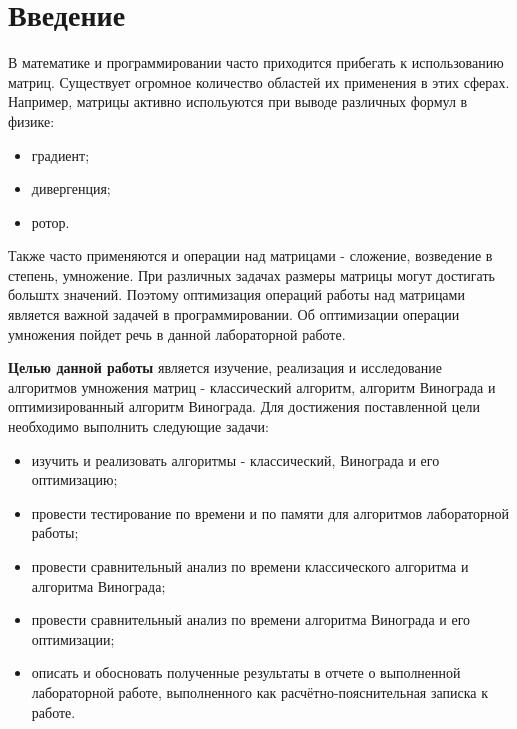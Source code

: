 \chapter*{Введение}

В математике и программировании часто приходится прибегать к использованию матриц. Существует огромное количество областей их применения в этих сферах. Например, матрицы активно испольуются при выводе различных формул в физике:

\begin{itemize}
    \item градиент;
    \item дивергенция;
    \item ротор.
\end{itemize}

Также часто применяются и операции над матрицами - сложение, возведение в степень, умножение. При различных задачах размеры матрицы могут достигать больштх значений. Поэтому оптимизация операций работы над матрицами является важной задачей в программировании. Об оптимизации операции умножения пойдет речь в данной лабораторной работе.


\textbf{Целью данной работы} является изучение, реализация и исследование алгоритмов умножения матриц - классический алгоритм, алгоритм Винограда и оптимизированный алгоритм Винограда. 
Для достижения поставленной цели необходимо выполнить следующие задачи:
\begin{itemize}
	\item изучить и реализовать алгоритмы - классический, Винограда и его оптимизацию;
    \item провести тестирование по времени и по памяти для алгоритмов лабораторной работы;
    \item провести сравнительный анализ по времени классического алгоритма и алгоритма Винограда;
    \item провести сравнительный анализ по времени алгоритма Винограда и его оптимизации;
	\item описать и обосновать полученные результаты в отчете о выполненной лабораторной работе, выполненного как расчётно-пояснительная записка к работе.
\end{itemize}
